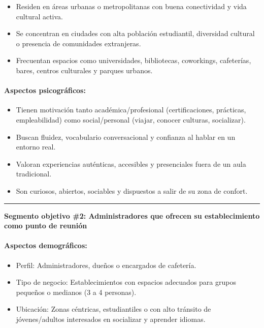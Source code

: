 \begin{itemize}
\tightlist
\item
  Residen en áreas urbanas o metropolitanas con buena conectividad y
  vida cultural activa.
\item
  Se concentran en ciudades con alta población estudiantil, diversidad
  cultural o presencia de comunidades extranjeras.
\item
  Frecuentan espacios como universidades, bibliotecas, coworkings,
  cafeterías, bares, centros culturales y parques urbanos.
\end{itemize}

\paragraph{Aspectos
psicográficos:}\label{report__10-cap1-introduccion.md__aspectos-psicogruxe1ficos}

\begin{itemize}
\tightlist
\item
  Tienen motivación tanto académica/profesional (certificaciones,
  prácticas, empleabilidad) como social/personal (viajar, conocer
  culturas, socializar).
\item
  Buscan fluidez, vocabulario conversacional y confianza al hablar en un
  entorno real.
\item
  Valoran experiencias auténticas, accesibles y presenciales fuera de un
  aula tradicional.
\item
  Son curiosos, abiertos, sociables y dispuestos a salir de su zona de
  confort.
\end{itemize}

\begin{center}\rule{0.5\linewidth}{0.5pt}\end{center}

\textbf{Segmento objetivo \#2: Administradores que ofrecen su
establecimiento como punto de reunión}

\paragraph{Aspectos
demográficos:}\label{report__10-cap1-introduccion.md__aspectos-demogruxe1ficos-1}

\begin{itemize}
\tightlist
\item
  Perfil: Administradores, dueños o encargados de cafetería.
\item
  Tipo de negocio: Establecimientos con espacios adecuados para grupos
  pequeños o medianos (3 a 4 personas).
\item
  Ubicación: Zonas céntricas, estudiantiles o con alto tránsito de
  jóvenes/adultos interesados en socializar y aprender idiomas.
\end{itemize}


